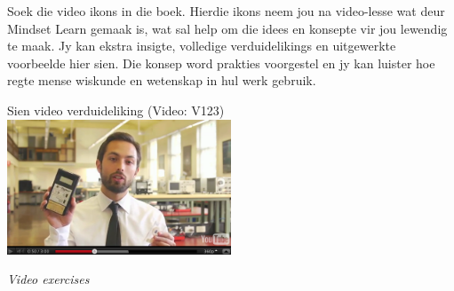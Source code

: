 {\normalsize

Soek die video ikons in die boek. Hierdie ikons neem jou na video-lesse wat deur Mindset Learn gemaak is, wat sal help om die idees en konsepte vir jou lewendig te maak. Jy kan ekstra insigte, volledige verduidelikings en uitgewerkte voorbeelde hier sien. Die konsep word prakties voorgestel en jy kan luister hoe regte mense wiskunde en wetenskap in hul werk gebruik. \par

\begin{center}
Sien video verduideliking  (Video: V123)\\
\includegraphics[width=0.5\textwidth]{title_images/veritasiumvideo.png}
\end{center}\par

}
\vspace{0.5cm}
{\normalfont\sffamily\fontsize{22}\normalfont\itshape Video exercises} \par

